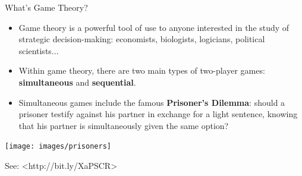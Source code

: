 \documentclass{beamer}
\begin{document}
\begin{frame}{What's Game Theory?}
  \begin{itemize}
  \item
    Game theory is a powerful tool of use to anyone interested in the study of strategic decision-making: economists, biologists, logicians, political scientists...
  \pause
  \item
    Within game theory, there are two main types of two-player games: \textbf{simultaneous} and \textbf{sequential}.
  \end{itemize}
\end{frame}
\begin{frame}
  \begin{itemize}
  \item
    Simultaneous games include the famous \textbf{Prisoner's Dilemma}: should a prisoner testify against his partner in exchange for a light sentence, knowing that his partner is simultaneously given the same option?
  \end{itemize}
  \begin{center}
    \texttt{[image: images/prisoners]}
  \end{center}
  {\tiny See: <http://bit.ly/XaPSCR>}
\end{frame}
\end{document}
